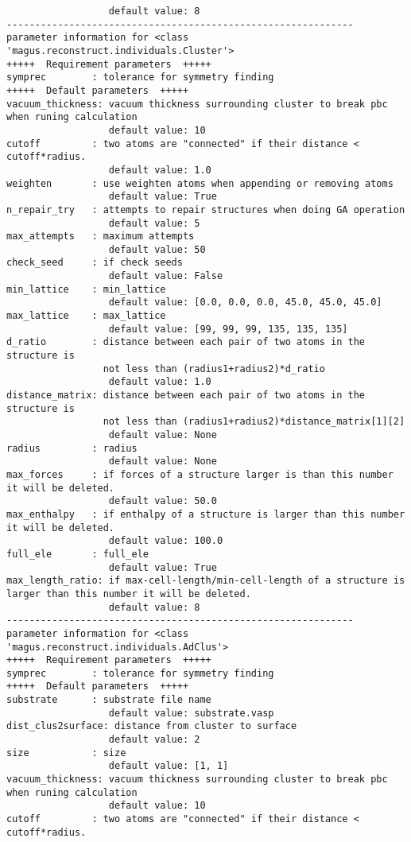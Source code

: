 \documentclass[12pt,oneside]{book}
\begin{document}
\begin{tcolorbox}
\begin{verbatim}
                  default value: 8
-------------------------------------------------------------
parameter information for <class 'magus.reconstruct.individuals.Cluster'>
+++++  Requirement parameters  +++++
symprec        : tolerance for symmetry finding
+++++  Default parameters  +++++
vacuum_thickness: vacuum thickness surrounding cluster to break pbc when runing calculation
                  default value: 10
cutoff         : two atoms are "connected" if their distance < cutoff*radius.
                  default value: 1.0
weighten       : use weighten atoms when appending or removing atoms
                  default value: True
n_repair_try   : attempts to repair structures when doing GA operation
                  default value: 5
max_attempts   : maximum attempts
                  default value: 50
check_seed     : if check seeds
                  default value: False
min_lattice    : min_lattice
                  default value: [0.0, 0.0, 0.0, 45.0, 45.0, 45.0]
max_lattice    : max_lattice
                  default value: [99, 99, 99, 135, 135, 135]
d_ratio        : distance between each pair of two atoms in the structure is
                 not less than (radius1+radius2)*d_ratio
                  default value: 1.0
distance_matrix: distance between each pair of two atoms in the structure is
                 not less than (radius1+radius2)*distance_matrix[1][2]
                  default value: None
radius         : radius
                  default value: None
max_forces     : if forces of a structure larger is than this number it will be deleted.
                  default value: 50.0
max_enthalpy   : if enthalpy of a structure is larger than this number it will be deleted.
                  default value: 100.0
full_ele       : full_ele
                  default value: True
max_length_ratio: if max-cell-length/min-cell-length of a structure is larger than this number it will be deleted.
                  default value: 8
-------------------------------------------------------------
parameter information for <class 'magus.reconstruct.individuals.AdClus'>
+++++  Requirement parameters  +++++
symprec        : tolerance for symmetry finding
+++++  Default parameters  +++++
substrate      : substrate file name
                  default value: substrate.vasp
dist_clus2surface: distance from cluster to surface
                  default value: 2
size           : size
                  default value: [1, 1]
vacuum_thickness: vacuum thickness surrounding cluster to break pbc when runing calculation
                  default value: 10
cutoff         : two atoms are "connected" if their distance < cutoff*radius.

\end{verbatim}
\end{tcolorbox}
\end{document}
